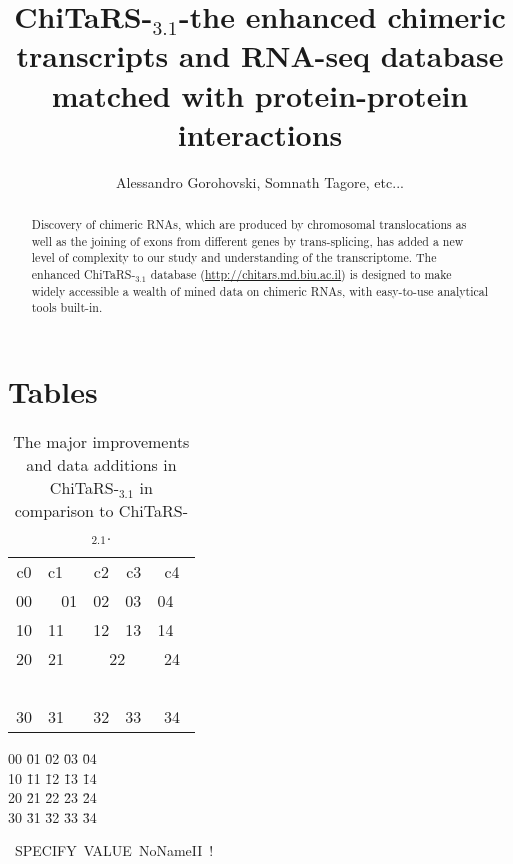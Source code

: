 \documentclass[10pt,a4paper]{article}
\title{
ChiTaRS-${}_{3.1}$-the enhanced chimeric transcripts and RNA-seq database matched with protein-protein interactions
}
\author{Alessandro Gorohovski, Somnath Tagore, etc...
}
\begin{document}
\maketitle

\begin{abstract}
Discovery of chimeric RNAs, which are produced by chromosomal translocations as well as 
the joining of exons from different genes by trans-splicing, has added a new level of complexity to our study and 
understanding of the transcriptome. The enhanced ChiTaRS-${}_{3.1}$ database (\url{http://chitars.md.biu.ac.il}) is designed 
to make widely accessible a wealth of mined data on chimeric RNAs, with easy-to-use analytical tools built-in.
\end{abstract}

\section{Tables}

\begin{table}[!ht]
  \caption{The major improvements and data additions in ChiTaRS-${}_{3.1}$ in comparison to ChiTaRS-${}_{2.1}$.
}
  \tabcolsep=2mm 
  \centering
  \begin{tabular}[t]{clcrc}
c0 & c1 & c2 & c3 & c4 \\
\rule{0mm}{1.5em}
00
 &
~
01
 &
02
 &
\color{green}
\scriptsize
03
 &
04
~
\\
\hline
\rule{0mm}{1.5em}
10
 &
11
 &
12
 &
13
 &
14
~
\\
\hline
\hline
\color{green}
\footnotesize\color{blue}
\rule{0mm}{1.5em}
20
 &
21
 &
\multicolumn{2}{c}{
22
}
 &
24
\\ \cline{3-4}
~
\\
\hline
\large\color{red}
\rule{0mm}{1.5em}
30
 &
31
 &
32
 &
33
 &
34
\\
\hline
  \end{tabular}
\end{table}

\begin{center}

\begin{tabbing}
00
 \=
01
 \=
02
 \=
03
 \=
04
\\
10
 \=
11
 \=
12
 \=
13
 \=
14
\\
20
 \=
21
 \=
22
 \=
23
 \=
24
\\
30
 \=
31
 \=
32
 \=
33
 \=
34
\end{tabbing}

\end{center}


\mbox{
SPECIFY VALUE NoNameII !
}
\end{document}
